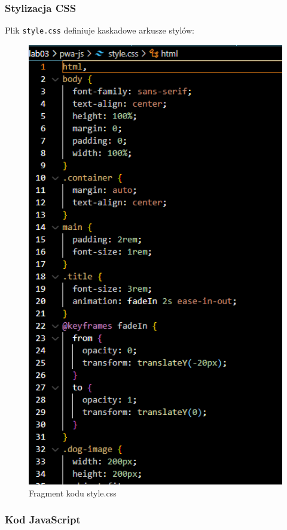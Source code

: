\documentclass[a4paper,12pt]{article}
\begin{document}
\subsubsection{Stylizacja CSS}
Plik \texttt{style.css} definiuje kaskadowe arkusze stylów:

\begin{figure}[H]
    \centering
    \includegraphics[width=1\textwidth]{images/css.png}
    \caption{Fragment kodu style.css}
\end{figure}

\subsubsection{Kod JavaScript}
\end{document}
